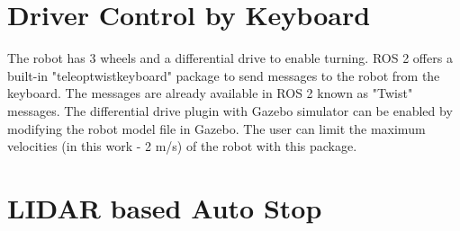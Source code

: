 \documentclass[%
xelatex,
	oneside,		%
	12pt,			%
	parskip=half,	%
	abstracton,
	chapterprefix=true%
    appendixprefix=true]
{scrbook}
\begin{document}
				\section{Driver Control by Keyboard}	
	\vspace*{0.25cm}
The robot has 3 wheels and a differential drive to enable turning. ROS 2 offers a built-in "teleop\textunderscore twist\textunderscore keyboard" package to send messages to the robot from the keyboard. The messages are already available in ROS 2 known as "Twist" messages. The differential drive plugin with Gazebo simulator can be enabled by modifying the robot model file in Gazebo. The user can limit the maximum velocities (in this work - 2 m/s) of the robot with this package. 	

		\section{LIDAR based Auto Stop}
		\vspace*{0.25cm}
		
\end{document}
